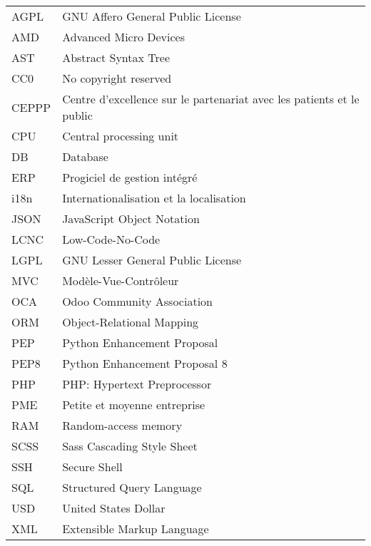 \chapter*{\abbrevname}
\pagestyle{pagenumber}
%
\begin{acronym}
\end{acronym}
%
\begin{longtable}{lp{5in}}
AGPL      & GNU Affero General Public License\\
AMD       & Advanced Micro Devices\\
AST       & Abstract Syntax Tree\\
CC0       & No copyright reserved\\
CEPPP     & Centre d'excellence sur le partenariat avec les patients et le public\\
CPU       & Central processing unit\\
DB        & Database\\
ERP       & Progiciel de gestion intégré\\
i18n      & Internationalisation et la localisation\\
JSON      & JavaScript Object Notation\\
LCNC      & Low-Code-No-Code\\
LGPL      & GNU Lesser General Public License\\
MVC       & Modèle-Vue-Contrôleur\\
OCA       & Odoo Community Association\\
ORM       & Object-Relational Mapping\\
PEP       & Python Enhancement Proposal\\
PEP8      & Python Enhancement Proposal 8\\
PHP       & PHP: Hypertext Preprocessor\\
PME       & Petite et moyenne entreprise\\
RAM       & Random-access memory\\
SCSS      & Sass Cascading Style Sheet\\
SSH       & Secure Shell\\
SQL       & Structured Query Language\\
USD       & United States Dollar\\
XML       & Extensible Markup Language\\

\end{longtable}
